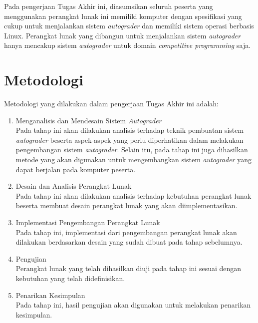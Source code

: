 \par Pada pengerjaan Tugas Akhir ini, diasumsikan seluruh peserta yang menggunakan perangkat lunak ini memiliki komputer dengan spesifikasi yang cukup untuk menjalankan sistem \textit{autograder} dan memiliki sistem operasi berbasis Linux. Perangkat lunak yang dibangun untuk menjalankan sistem \textit{autograder} hanya mencakup sistem \textit{autograder} untuk domain \textit{competitive programming} saja.

\section{Metodologi}

\par Metodologi yang dilakukan dalam pengerjaan Tugas Akhir ini adalah:
\begin{enumerate}

	\item Menganalisis dan Mendesain Sistem \textit{Autograder} \\ Pada tahap ini akan dilakukan analisis terhadap teknik pembuatan sistem \textit{autograder} beserta aspek-aspek yang perlu diperhatikan dalam melakukan pengembangan sistem \textit{autograder}. Selain itu, pada tahap ini juga dihasilkan metode yang akan digunakan untuk mengembangkan sistem \textit{autograder} yang dapat berjalan pada komputer peserta.
	
	\item Desain dan Analisis Perangkat Lunak \\ Pada tahap ini akan dilakukan analisis terhadap kebutuhan perangkat lunak beserta membuat desain perangkat lunak yang akan diimplementasikan.
	
	\item Implementasi Pengembangan Perangkat Lunak \\ Pada tahap ini, implementasi dari pengembangan perangkat lunak akan dilakukan berdasarkan desain yang sudah dibuat pada tahap sebelumnya.
	
	\item Pengujian \\ Perangkat lunak yang telah dihasilkan diuji pada tahap ini sesuai dengan kebutuhan yang telah didefinisikan.
	
	\item Penarikan Kesimpulan \\ Pada tahap ini, hasil pengujian akan digunakan untuk melakukan penarikan kesimpulan.

\end{enumerate}

